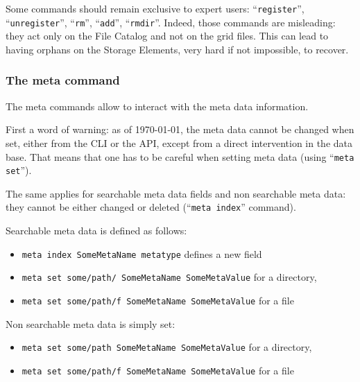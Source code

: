 \documentclass[11pt,a4paper]{scrartcl}
\begin{document}
Some commands should remain exclusive to expert users: ``\lstinline|register|'',
``\lstinline|unregister|'', ``\lstinline|rm|'', ``\lstinline|add|'',
``\lstinline|rmdir|''. Indeed, those commands are misleading: they act only on the
File Catalog and not on the grid files. This can lead to having orphans on the Storage Elements, very hard if not impossible,
to recover.

\subsubsection{The meta command}\label{sec:meta}
The meta commands allow to interact with the meta data information. 

First a word of warning: as of \today, the meta data cannot be changed when set,
either from the CLI or the API, except from a direct intervention in the data
base. That means that one has to be careful when setting meta data (using
``\lstinline|meta set|'').

The same applies for searchable meta data fields and non searchable meta data:
they cannot be either changed or deleted (``\lstinline|meta index|'' command). 

Searchable meta data is defined as follows:
\begin{itemize}
  \item \lstinline|meta index SomeMetaName metatype| defines a new field
  \item \lstinline|meta set some/path/ SomeMetaName SomeMetaValue| for a
  directory,
  \item \lstinline|meta set some/path/f SomeMetaName SomeMetaValue| for a
  file
\end{itemize}

Non searchable meta data is simply set:
\begin{itemize}
  \item \lstinline|meta set some/path SomeMetaName SomeMetaValue| for a
  directory,
  \item \lstinline|meta set some/path/f SomeMetaName SomeMetaValue| for a file
\end{itemize}

~\\
\end{document}
